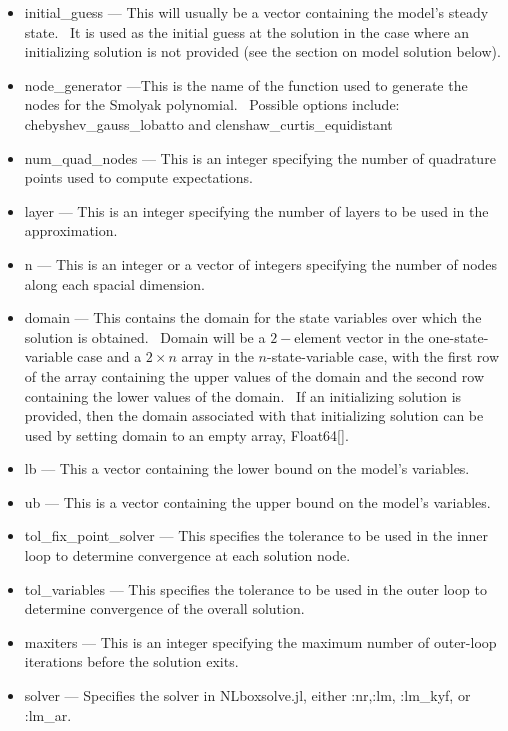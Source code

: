 \documentclass[notitlepage,11pt]{article}
\begin{document}
\begin{itemize}
\item initial\_guess --- This will usually be a vector containing the
model's steady state. \ It is used as the initial guess at the solution in
the case where an initializing solution is not provided (see the section on
model solution below).

\item node\_generator ---This is the name of the function used to generate
the nodes for the Smolyak polynomial. \ Possible options include:
chebyshev\_gauss\_lobatto and clenshaw\_curtis\_equidistant

\item num\_quad\_nodes --- This is an integer specifying the number of
quadrature points used to compute expectations.

\item layer --- This is an integer specifying the number of layers to be
used in the approximation.

\item n --- This is an integer or a vector of integers specifying the number
of nodes along each spacial dimension.

\item domain --- This contains the domain for the state variables over which
the solution is obtained. \ Domain will be a $2-$element vector in the
one-state-variable case and a $2\times n$ array in the $n$-state-variable
case, with the first row of the array containing the upper values of the
domain and the second row containing the lower values of the domain. \ If an
initializing solution is provided, then the domain associated with that
initializing solution can be used by setting domain to an empty array,
Float64[].

\item lb --- This a vector containing the lower bound on the model's
variables.

\item ub --- This is a vector containing the upper bound on the model's
variables.

\item tol\_fix\_point\_solver --- This specifies the tolerance to be used in
the inner loop to determine convergence at each solution node.

\item tol\_variables --- This specifies the tolerance to be used in the
outer loop to determine convergence of the overall solution.

\item maxiters --- This is an integer specifying the maximum number of
outer-loop iterations before the solution exits.

\item solver --- Specifies the solver in NLboxsolve.jl, either :nr,:lm,
:lm\_kyf, or :lm\_ar.
\end{itemize}
\end{document}
